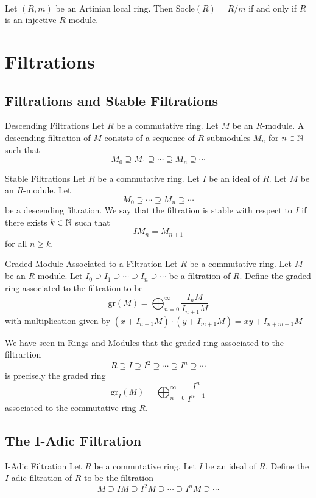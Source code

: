 \documentclass[a4paper]{article}
\begin{document}
\begin{prp}{}{}\\
Let $(R,m)$ be an Artinian local ring. Then $\text{Socle}(R)=R/m$ if and only if $R$ is an injective $R$-module. 
\end{prp}

\pagebreak
\section{Filtrations}
\subsection{Filtrations and Stable Filtrations}
\begin{defn}{Descending Filtrations}{} Let $R$ be a commutative ring. Let $M$ be an $R$-module. A descending filtration of $M$ consists of a sequence of $R$-submodules $M_n$ for $n\in\mathbb{N}$ such that $$M_0\supseteq M_1\supseteq\cdots\supseteq M_n\supseteq\cdots$$
\end{defn}

\begin{defn}{Stable Filtrations}{} Let $R$ be a commutative ring. Let $I$ be an ideal of $R$. Let $M$ be an $R$-module. Let $$M_0\supseteq\cdots\supseteq M_n\supseteq\cdots$$ be a descending filtration. We say that the filtration is stable with respect to $I$ if there exists $k\in\mathbb{N}$ such that $$IM_n=M_{n+1}$$ for all $n\geq k$. 
\end{defn}

\begin{defn}{Graded Module Associated to a Filtration}{} Let $R$ be a commutative ring. Let $M$ be an $R$-module. Let $I_0\supseteq I_1\supseteq\cdots\supseteq I_n\supseteq\cdots$ be a filtration of $R$. Define the graded ring associated to the filtration to be $$\text{gr}(M)=\bigoplus_{n=0}^\infty\frac{I_nM}{I_{n+1}M}$$ with multiplication given by $(x+I_{n+1}M)\cdot(y+I_{m+1}M)=xy+I_{n+m+1}M$
\end{defn}

We have seen in Rings and Modules that the graded ring associated to the filtrartion $$R\supseteq I\supseteq I^2\supseteq\cdots\supseteq I^n\supseteq\cdots$$ is precisely the graded ring $$\text{gr}_I(M)=\bigoplus_{n=0}^\infty\frac{I^n}{I^{n+1}}$$ associated to the commutative ring $R$. 

\subsection{The I-Adic Filtration}
\begin{defn}{I-Adic Filtration}{} Let $R$ be a commutative ring. Let $I$ be an ideal of $R$. Define the $I$-adic filtration of $R$ to be the filtration $$M\supseteq IM\supseteq I^2M\supseteq\cdots\supseteq I^nM\supseteq\cdots$$
\end{defn}
\end{document}
